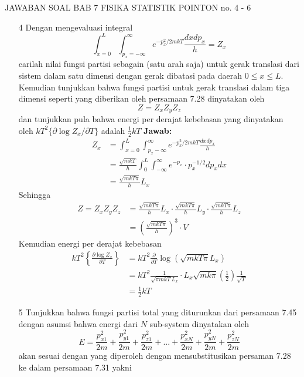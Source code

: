 \documentclass[a4paper , 12 pt]{article}
\begin{document}
\centering JAWABAN SOAL BAB 7 FISIKA STATISTIK POINTON no. 4 - 6
\begin{enumerate}
\item[4]
Dengan mengevaluasi integral
\[
\int_{x = 0}^L \int_{p_x = - \infty}^\infty e^{- p_x^2 / 2 m kT} \frac{dx d p_x}{h} = Z_x 
\]
carilah nilai fungsi partisi sebagain (satu arah saja) untuk gerak translasi dari sistem  dalam satu dimensi  dengan gerak dibatasi pada daerah $0 \le x \le L$. Kemudian tunjukkan bahwa fungsi partisi untuk gerak translasi dalam tiga dimensi seperti yang diberikan oleh persamaan 7.28 dinyatakan oleh 
\[
Z = Z_x Z_y Z_z
\]
dan tunjukkan pula bahwa energi per derajat kebebasan yang dinyatakan oleh $k T^2 \{\partial \log Z_x /\partial T  \}$ adalah $\displaystyle \frac{1}{2} kT$ \newline \newline
\textbf{Jawab:}
\begin{align}
Z_x  &= \int_{x = 0}^L \int_{p_x  - \infty}^\infty e^{- p_x^2 / 2 m kT} \frac{dx d p_x}{h}     \nonumber \\
& =\frac{\sqrt{m k T}}{h} \int_{0}^L \int_{-\infty}^{\infty} e^ { - p_x} \cdot p_x^{-1/2} d p_x d x \nonumber \\
& = \frac{\sqrt{m k T \pi }}{h} L_x \tag{iii.1}
\end{align}
Sehingga
\begin{align}
Z = Z_x Z_y Z_z &  =  \frac{\sqrt{m k T \pi }}{h} L_x \cdot  \frac{\sqrt{m k T \pi }}{h} L_y \cdot  \frac{\sqrt{m k T \pi }}{h} L_z \nonumber \\
& =  \left(\frac{\sqrt{m k T \pi }}{h}\right)^3 \cdot V \tag{QED}
\end{align}
Kemudian energi per derajat kebebasan 
\begin{align}
k T^2 \left \{  \frac{\partial \log Z_x}{\partial T} \right\} & = k T^2
 \frac{\partial}{\partial  T}\log \left ( \sqrt{mkT\pi} L_x\right)  \nonumber
 \\
& = k T^2 \frac{1}{\sqrt{\pi mkT} L_x} \cdot L_x \sqrt{m k \pi } \left(\frac{1}{2}\right) \frac{1}{\sqrt{T}} \nonumber \\
& = \frac{1}{2} k T \tag{QED} 
\end{align}
\item[5] Tunjukkan bahwa fungsi partisi total yang diturunkan dari persamaan 7.45 dengan asumsi bahwa energi dari $N$ sub-system dinyatakan oleh
\[
E  = \frac{p_{x1}^2}{2m} + \frac{p_{y1}^2}{2m} + \frac{p_{z1}^2}{2m} + ... + \frac{p_{xN}^2}{2m} +\frac{p_{yN}^2}{2m} +\frac{p_{zN}^2}{2m}
  \] 
akan sesuai dengan yang diperoleh dengan mensubstitusikan persaman 7.28 ke dalam persamaan 7.31 yakni

\end{enumerate}
\end{document}
